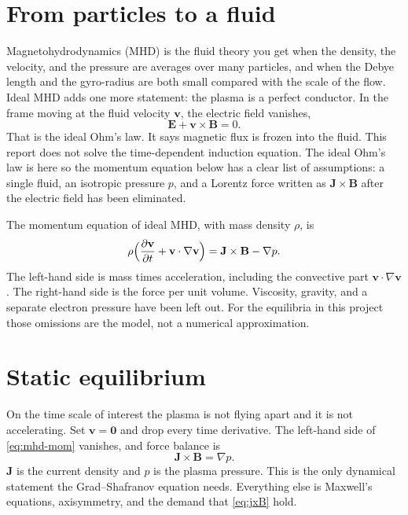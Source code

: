 \documentclass[11pt,a4paper,oneside,openany]{book}
\numberwithin{equation}{chapter}
\newcommand{\grad}{\nabla}
\theoremstyle{definition}
\begin{document}
\section{From particles to a fluid}

Magnetohydrodynamics (MHD) is the fluid theory you get when the density, the velocity, and the pressure are averages over many particles, and when the Debye length and the gyro-radius are both small compared with the scale of the flow. Ideal MHD adds one more statement: the plasma is a perfect conductor. In the frame moving at the fluid velocity \(\mathbf{v}\), the electric field vanishes,
\begin{equation}
\label{eq:ohm}
\mathbf{E}+\mathbf{v}\times\mathbf{B}=0.
\end{equation}
That is the ideal Ohm's law. It says magnetic flux is frozen into the fluid. This report does not solve the time-dependent induction equation. The ideal Ohm's law is here so the momentum equation below has a clear list of assumptions: a single fluid, an isotropic pressure \(p\), and a Lorentz force written as \(\mathbf{J}\times\mathbf{B}\) after the electric field has been eliminated.

The momentum equation of ideal MHD, with mass density \(\rho\), is
\begin{equation}
\label{eq:mhd-mom}
\rho\Bigl(\frac{\partial\mathbf{v}}{\partial t}+\mathbf{v}\cdot\grad\mathbf{v}\Bigr)
=\mathbf{J}\times\mathbf{B}-\grad p.
\end{equation}
The left-hand side is mass times acceleration, including the convective part \(\mathbf{v}\cdot\grad\mathbf{v}\). The right-hand side is the force per unit volume. Viscosity, gravity, and a separate electron pressure have been left out. For the equilibria in this project those omissions are the model, not a numerical approximation.

\section{Static equilibrium}

On the time scale of interest the plasma is not flying apart and it is not accelerating. Set \(\mathbf{v}=\mathbf{0}\) and drop every time derivative. The left-hand side of \eqref{eq:mhd-mom} vanishes, and force balance is
\begin{equation}
\label{eq:jxB}
\mathbf{J}\times\mathbf{B}=\grad p.
\end{equation}
\(\mathbf{J}\) is the current density and \(p\) is the plasma pressure. This is the only dynamical statement the Grad--Shafranov equation needs. Everything else is Maxwell's equations, axisymmetry, and the demand that \eqref{eq:jxB} hold.
\end{document}
